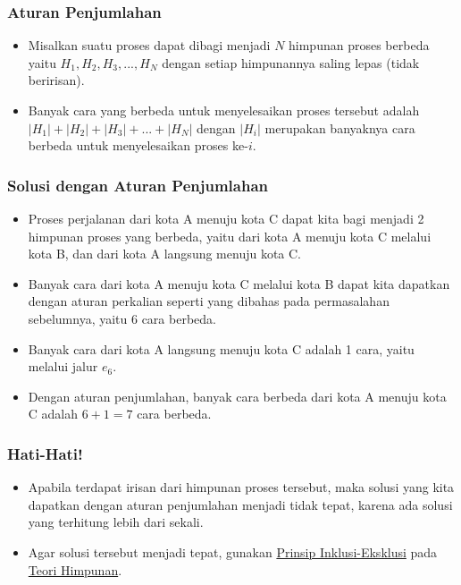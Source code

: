 \begin{frame}
\frametitle{Aturan Penjumlahan}
\begin{itemize}
  \item Misalkan suatu proses dapat dibagi menjadi $N$ himpunan proses berbeda yaitu $H_{1}, H_{2}, H_{3}, ... , H_{N}$ dengan setiap himpunannya saling lepas (tidak beririsan).
  \item Banyak cara yang berbeda untuk menyelesaikan proses tersebut adalah $|H_{1}| + |H_{2}| + |H_{3}| + ... + |H_{N}|$ dengan $|H_{i}|$ merupakan banyaknya cara berbeda untuk menyelesaikan proses ke-$i$.
\end{itemize}
\end{frame}

\begin{frame}
\frametitle{Solusi dengan Aturan Penjumlahan}
\begin{itemize}
  \item Proses perjalanan dari kota A menuju kota C dapat kita bagi menjadi 2 himpunan proses yang berbeda, yaitu dari kota A menuju kota C melalui kota B, dan dari kota A langsung menuju kota C.
  \item Banyak cara dari kota A menuju kota C melalui kota B dapat kita dapatkan dengan aturan perkalian seperti yang dibahas pada permasalahan sebelumnya, yaitu 6 cara berbeda.
  \item Banyak cara dari kota A langsung menuju kota C adalah 1 cara, yaitu melalui jalur $e_{6}$.
  \item Dengan aturan penjumlahan, banyak cara berbeda dari kota A menuju kota C adalah $6 + 1 = 7$ cara berbeda.
\end{itemize}
\end{frame}

\begin{frame}
\frametitle{Hati-Hati!}
\begin{itemize}
  \item Apabila terdapat irisan dari himpunan proses tersebut, maka solusi yang kita dapatkan dengan aturan penjumlahan menjadi tidak tepat, karena ada solusi yang terhitung lebih dari sekali.
  \item Agar solusi tersebut menjadi tepat, gunakan \textcolor{blue}{\href{https://en.wikipedia.org/wiki/Inclusion-exclusion\_principle}{Prinsip Inklusi-Eksklusi}} pada \textcolor{blue}{\href{https://id.wikipedia.org/wiki/Himpunan}{Teori Himpunan}}.
\end{itemize}
\end{frame}

